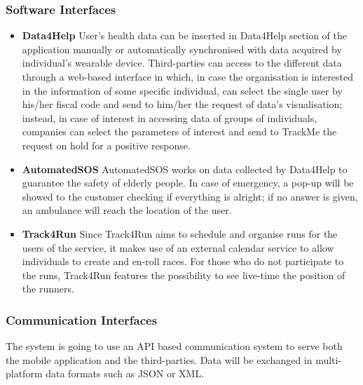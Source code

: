 \documentclass{article}
\begin{document}
	\subsubsection{Software Interfaces}
	\begin{itemize}
		\item \textbf{Data4Help} \newline 
		User's health data can be inserted in Data4Help section of the
		application manually or automatically synchronised with data
		acquired by individual's wearable device. \newline
		Third-parties can access to the different data through a 
		web-based interface in which, in case the organisation is 
		interested in the information of some specific individual, 
		can select the single user by his/her fiscal code and send to
		him/her the request of data's visualisation; instead, in 
		case of interest in accessing data of groups of individuals, 
		companies can select the parameters of interest and send to 
		TrackMe the request on hold for a positive response.
		\item \textbf{AutomatedSOS} \newline
		AutomatedSOS works on data collected by Data4Help to 
		guarantee the safety of elderly people. \newline
		In case of emergency, a pop-up will be showed to the customer
		checking if everything is alright; if no answer is given,
		an ambulance will reach the location of the user.
		\item \textbf{Track4Run} \newline
		Since Track4Run aims to schedule and organise runs for the 
		users of the service, it makes use of an external calendar
		service to allow individuals to create and en-roll races. 
		\newline
		For those who do not participate to the runs, Track4Run 
		features the possibility to see live-time the position of
		the runners.
	\end{itemize} 
	
	\subsubsection{Communication Interfaces}
	The system is going to use an API based communication system to 
	serve both the mobile application and the third-parties. \newline
	Data will be exchanged in multi-platform data formats such as 
	JSON or XML.
		
\end{document}
